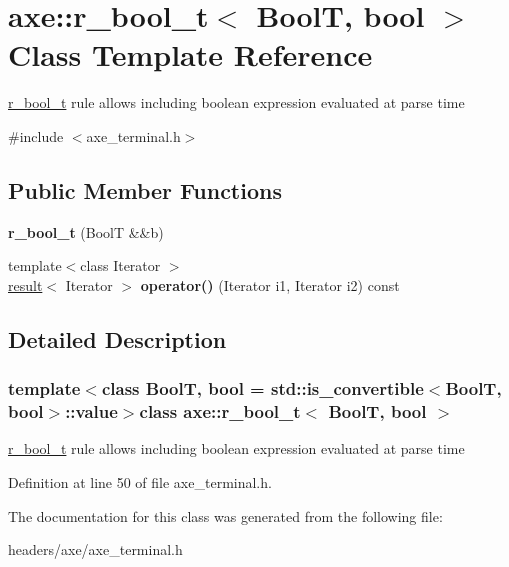 \hypertarget{classaxe_1_1r__bool__t}{\section{axe\+:\+:r\+\_\+bool\+\_\+t$<$ Bool\+T, bool $>$ Class Template Reference}
\label{classaxe_1_1r__bool__t}
}


\hyperlink{classaxe_1_1r__bool__t}{r\+\_\+bool\+\_\+t} rule allows including boolean expression evaluated at parse time  




{\ttfamily \#include $<$axe\+\_\+terminal.\+h$>$}

\subsection*{Public Member Functions}
\begin{DoxyCompactItemize}
\item 
\hypertarget{classaxe_1_1r__bool__t_a3bb8c366fd07e738e6a2326b434f83bc}{{\bfseries r\+\_\+bool\+\_\+t} (Bool\+T \&\&b)}\label{classaxe_1_1r__bool__t_a3bb8c366fd07e738e6a2326b434f83bc}

\item 
\hypertarget{classaxe_1_1r__bool__t_aaa3f4a67a57def5b944ae6d7a45bdb8a}{{\footnotesize template$<$class Iterator $>$ }\\\hyperlink{structaxe_1_1result}{result}$<$ Iterator $>$ {\bfseries operator()} (Iterator i1, Iterator i2) const }\label{classaxe_1_1r__bool__t_aaa3f4a67a57def5b944ae6d7a45bdb8a}

\end{DoxyCompactItemize}


\subsection{Detailed Description}
\subsubsection*{template$<$class Bool\+T, bool = std\+::is\+\_\+convertible$<$\+Bool\+T, bool$>$\+::value$>$class axe\+::r\+\_\+bool\+\_\+t$<$ Bool\+T, bool $>$}

\hyperlink{classaxe_1_1r__bool__t}{r\+\_\+bool\+\_\+t} rule allows including boolean expression evaluated at parse time 

Definition at line 50 of file axe\+\_\+terminal.\+h.



The documentation for this class was generated from the following file\+:\begin{DoxyCompactItemize}
\item 
headers/axe/axe\+\_\+terminal.\+h\end{DoxyCompactItemize}
